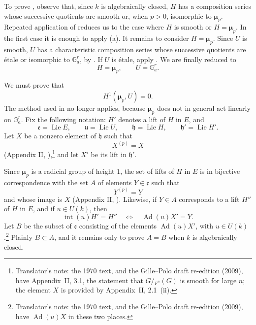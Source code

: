 To prove , observe that, since \(k\) is algebraically
closed, \(H\) has a composition series whose successive quotients
are smooth or, when \(p>0\), isomorphic to \(\boldsymbol\mu_p\).
Repeated application of  reduces us to the case where \(H\) is
smooth or \(H=\boldsymbol\mu_p\).  In the first case it is enough to
apply (a).  It remains to consider \(H=\boldsymbol\mu_p\).
Since \(U\) is smooth, \(U\) has a characteristic composition series
whose successive quotients are étale or isomorphic to
\(\mathbb G_a^r\), by .  If \(U\) is étale, apply .  We are
finally reduced to
\[
  H=\boldsymbol\mu_p,\qquad U=\mathbb G_a^r.
\]

We must prove that
\[
  H^1(\boldsymbol\mu_p,U)=0.
\]
The method used in  no longer applies, because
\(\boldsymbol\mu_p\) does not in general act linearly on
\(\mathbb G_a^r\).  Fix the following notation: \(H'\) denotes a
lift of \(H\) in \(E\), and
\[
  \mathfrak e=\operatorname{Lie}E,\qquad
  \mathfrak u=\operatorname{Lie}U,\qquad
  \mathfrak h=\operatorname{Lie}H,\qquad
  \mathfrak h'=\operatorname{Lie}H'.
\]
Let \(X\) be a nonzero element of \(\mathfrak h\) such that
\[
  X^{(p)}=X
\]
(Appendix II, ),\footnote{Translator's note: the 1970 text, and the Gille--Polo draft re-edition (2009), have
Appendix~II, 3.1, the statement that \(G/{}_{F^n}(G)\) is smooth for large \(n\); the
element \(X\) is provided by Appendix~II, 2.1~(ii).} and let \(X'\) be its lift in \(\mathfrak h'\).

Since \(\boldsymbol\mu_p\) is a radicial group of height \(1\), the
set of lifts of \(H\) in \(E\) is in bijective correspondence with
the set \(A\) of elements \(Y\in\mathfrak e\) such that
\[
  Y^{(p)}=Y
\]
and whose image is \(X\) (Appendix II, ).  Likewise, if
\(Y\in A\) corresponds to a lift \(H''\) of \(H\) in \(E\), and if
\(u\in U(k)\), then
\[
  \operatorname{int}(u)H'=H''
  \quad\Longleftrightarrow\quad
  \operatorname{Ad}(u)X'=Y.
\]
Let \(B\) be the subset of \(\mathfrak e\) consisting of the
elements \(\operatorname{Ad}(u)X'\), with \(u\in U(k)\).\footnote{Translator's note: the 1970 text, and the Gille--Polo draft re-edition (2009), have
\(\operatorname{Ad}(u)X\) in these two places.}  Plainly
\(B\subset A\), and it remains only to prove \(A=B\) when \(k\) is
algebraically closed.

